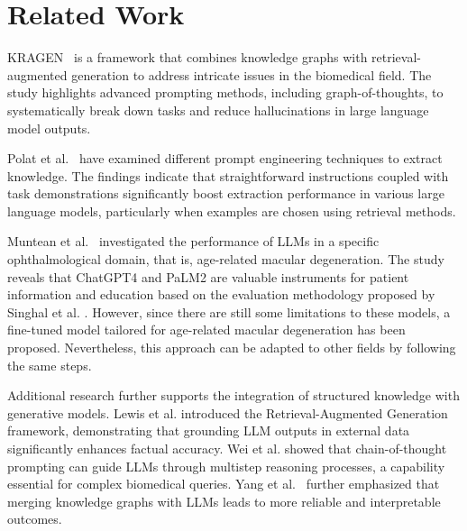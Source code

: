 \section{Related Work}
KRAGEN~\cite{kragen_2024} is a framework that combines knowledge graphs with retrieval-augmented generation to address intricate issues in the biomedical field. The study highlights advanced prompting methods, including graph-of-thoughts, to systematically break down tasks and reduce hallucinations in large language model outputs.

Polat et al.~\cite{pub.1182771521} have examined different prompt engineering techniques to extract knowledge. The findings indicate that straightforward instructions coupled with task demonstrations significantly boost extraction performance in various large language models, particularly when examples are chosen using retrieval methods.

Muntean et al.~\cite{diagnostics14141468} investigated the performance of LLMs in a specific ophthalmological domain, that is, age-related macular degeneration. The study reveals that ChatGPT4 and PaLM2 are valuable instruments for patient information and education based on the evaluation methodology proposed by Singhal et al. \cite{singhal2023large}. However, since there are still some limitations to these models, a fine-tuned model tailored for age-related macular degeneration has been proposed. Nevertheless, this approach can be adapted to other fields by following the same steps.

Additional research further supports the integration of structured knowledge with generative models. Lewis et al.\cite{Lewis_NEURIPS2020} introduced the Retrieval-Augmented Generation framework, demonstrating that grounding LLM outputs in external data significantly enhances factual accuracy. Wei et al.\cite{wei2022chain} showed that chain-of-thought prompting can guide LLMs through multistep reasoning processes, a capability essential for complex biomedical queries. Yang et al.~\cite{yang2024kgllm} further emphasized that merging knowledge graphs with LLMs leads to more reliable and interpretable outcomes.
